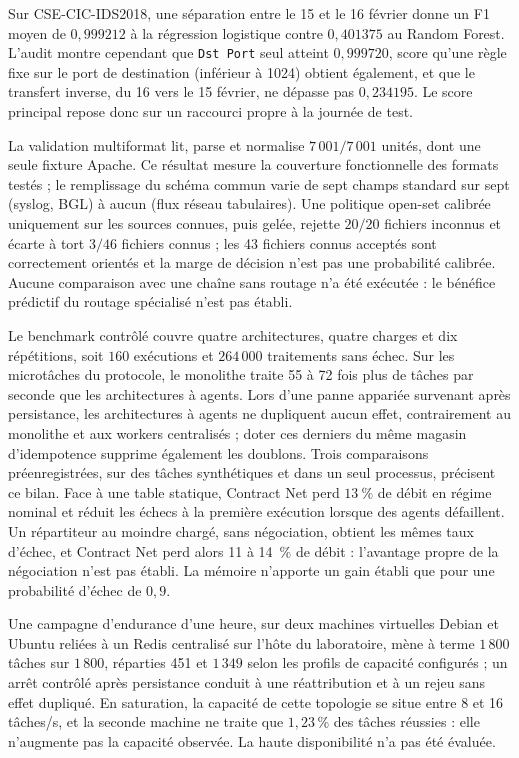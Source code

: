 Sur CSE-CIC-IDS2018, une séparation entre le 15 et le 16 février donne un F1
moyen de $0{,}999212$ à la régression logistique contre $0{,}401375$ au
Random Forest. L'audit montre cependant que \texttt{Dst Port} seul atteint
$0{,}999720$, score qu'une règle fixe sur le port de destination (inférieur à
1024) obtient également, et que le transfert inverse, du 16 vers le
15 février, ne dépasse pas $0{,}234195$. Le score principal repose donc sur
un raccourci propre à la journée de test.

La validation multiformat lit, parse et normalise $7\,001/7\,001$ unités, dont
une seule fixture Apache. Ce résultat mesure la couverture fonctionnelle des
formats testés ; le remplissage du schéma commun varie de sept champs standard
sur sept (syslog, BGL) à aucun (flux réseau tabulaires). Une politique
open-set calibrée uniquement sur les sources connues, puis gelée, rejette
$20/20$ fichiers inconnus et écarte à tort $3/46$ fichiers connus ; les
43 fichiers connus acceptés sont correctement orientés et la marge de décision
n'est pas une probabilité calibrée. Aucune comparaison avec une chaîne sans
routage n'a été exécutée : le bénéfice prédictif du routage spécialisé n'est
pas établi.

Le benchmark contrôlé couvre quatre architectures, quatre charges et dix
répétitions, soit $160$ exécutions et $264\,000$ traitements sans échec. Sur les microtâches du protocole, le monolithe traite 55 à 72 fois plus de tâches par seconde que les architectures à agents. Lors d'une panne appariée survenant
après persistance, les architectures à agents ne dupliquent aucun effet,
contrairement au monolithe et aux workers centralisés ; doter ces derniers du même magasin d'idempotence supprime également les doublons. Trois comparaisons préenregistrées, sur des tâches synthétiques et dans un seul processus, précisent ce bilan. Face à une table statique, Contract Net perd $13~\%$ de débit en régime nominal et réduit les échecs à la première exécution lorsque des agents défaillent. Un répartiteur au moindre chargé, sans négociation, obtient les mêmes taux d'échec, et Contract Net perd alors 11 à 14~\% de débit : l'avantage propre de la négociation n'est pas établi. La mémoire n'apporte un gain établi que pour une probabilité d'échec de $0{,}9$.

Une campagne d'endurance d'une heure, sur deux machines virtuelles Debian et
Ubuntu reliées à un Redis centralisé sur l'hôte du laboratoire, mène à terme
$1\,800$ tâches sur $1\,800$, réparties 451 et $1\,349$ selon les profils de
capacité configurés ; un arrêt contrôlé après persistance conduit à une
réattribution et à un rejeu sans effet dupliqué. En saturation, la capacité
de cette topologie se situe entre 8 et 16 tâches/s, et la seconde machine ne
traite que $1{,}23\,\%$ des tâches réussies : elle n'augmente pas la capacité
observée. La haute disponibilité n'a pas été évaluée.

